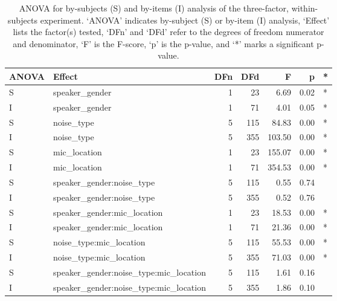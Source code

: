 \begin{table}[ht]
\centering
\begin{tabular}{llrrrrl}
  \hline
ANOVA & Effect & DFn & DFd & F & p & * \\ 
  \hline
S & speaker\_gender & 1 & 23 & 6.69 & 0.02 & * \\ 
  I & speaker\_gender & 1 & 71 & 4.01 & 0.05 & * \\ 
  S & noise\_type & 5 & 115 & 84.83 & 0.00 & * \\ 
  I & noise\_type & 5 & 355 & 103.50 & 0.00 & * \\ 
  S & mic\_location & 1 & 23 & 155.07 & 0.00 & * \\ 
  I & mic\_location & 1 & 71 & 354.53 & 0.00 & * \\ 
  S & speaker\_gender:noise\_type & 5 & 115 & 0.55 & 0.74 &  \\ 
  I & speaker\_gender:noise\_type & 5 & 355 & 0.52 & 0.76 &  \\ 
  S & speaker\_gender:mic\_location & 1 & 23 & 18.53 & 0.00 & * \\ 
  I & speaker\_gender:mic\_location & 1 & 71 & 21.36 & 0.00 & * \\ 
  S & noise\_type:mic\_location & 5 & 115 & 55.53 & 0.00 & * \\ 
  I & noise\_type:mic\_location & 5 & 355 & 71.03 & 0.00 & * \\ 
  S & speaker\_gender:noise\_type:mic\_location & 5 & 115 & 1.61 & 0.16 &  \\ 
  I & speaker\_gender:noise\_type:mic\_location & 5 & 355 & 1.86 & 0.10 &  \\ 
   \hline
\end{tabular}
\caption{ANOVA for by-subjects (S) and by-items (I) analysis of the three-factor, within-subjects experiment. `ANOVA' indicates by-subject (S) or by-item (I) analysis, `Effect' lists the factor(s) tested, `DFn' and `DFd' refer to the degrees of freedom numerator and denominator, `F' is the F-score, `p' is the p-value, and `*' marks a significant p-value.} 
\label{tab:anova1}
\end{table}



